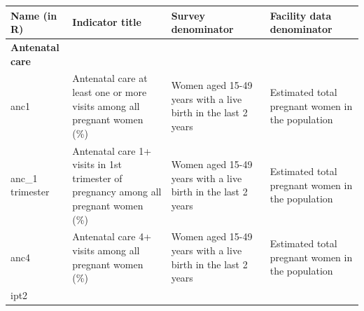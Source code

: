 \documentclass[
  english,
  letterpaper,
  DIV=11,
  numbers=noendperiod]{scrreprt}
\begin{document}
\begin{longtable}[]{@{}
  >{\raggedright\arraybackslash}p{}
  >{\raggedright\arraybackslash}p{}
  >{\raggedright\arraybackslash}p{}
  >{\raggedright\arraybackslash}p{}@{}}
\toprule\noalign{}
\begin{minipage}[b]{\linewidth}\raggedright
\textbf{Name (in R)}
\end{minipage} & \begin{minipage}[b]{\linewidth}\raggedright
\textbf{Indicator title}
\end{minipage} & \begin{minipage}[b]{\linewidth}\raggedright
\textbf{Survey denominator}
\end{minipage} & \begin{minipage}[b]{\linewidth}\raggedright
\textbf{Facility data denominator}
\end{minipage} \\
\midrule\noalign{}
\endhead
\bottomrule\noalign{}
\endlastfoot
\textbf{Antenatal care} & & & \\
anc1 & Antenatal care at least one or more visits among all pregnant
women (\%) & Women aged 15-49 years with a live birth in the last 2
years & Estimated total pregnant women in the population \\
anc\_1 trimester & Antenatal care 1+ visits in 1st trimester of
pregnancy among all pregnant women (\%) & Women aged 15-49 years with a
live birth in the last 2 years & Estimated total pregnant women in the
population \\
anc4 & Antenatal care 4+ visits among all pregnant women (\%) & Women
aged 15-49 years with a live birth in the last 2 years & Estimated total
pregnant women in the population \\
ipt2


\end{longtable}
\end{document}
